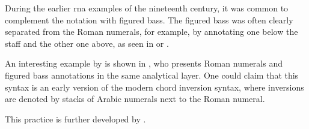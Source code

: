 
During the earlier \gls{rna} examples of the nineteenth
century, it was common to complement the notation with
figured bass. The figured bass was often clearly separated
from the Roman numerals, for example, by annotating one
below the staff and the other one above, as seen in
 or
.

An interesting example by \textcite{bussler1878praktische}
is shown in
, who
presents Roman numerals and figured bass annotations in the
same analytical layer. One could claim that this syntax is
an early version of the modern chord inversion syntax, where
inversions are denoted by stacks of Arabic numerals next to
the Roman numeral.


This practice is further developed by
\textcite{emery1879elements}. 

